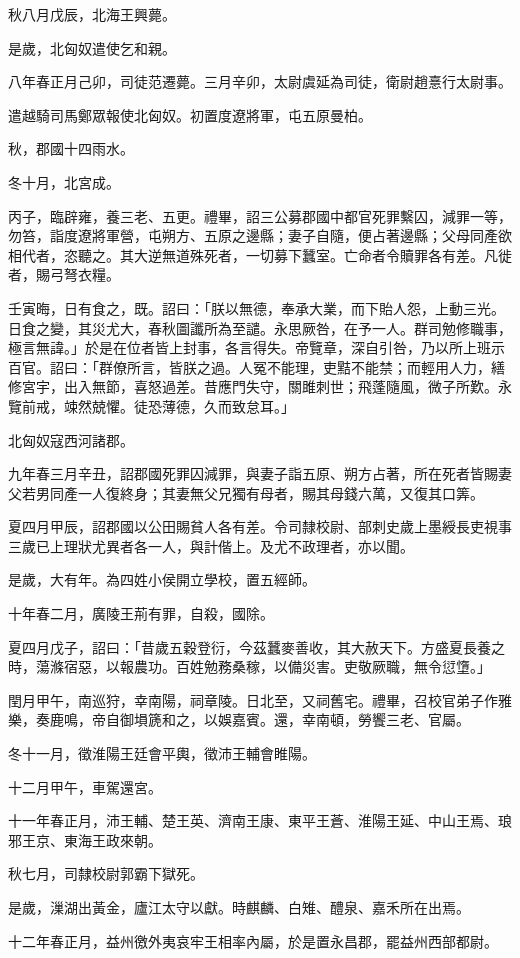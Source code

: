 \begin{pinyinscope}
秋八月戊辰，北海王興薨。

是歲，北匈奴遣使乞和親。

八年春正月己卯，司徒范遷薨。三月辛卯，太尉虞延為司徒，衛尉趙憙行太尉事。

遣越騎司馬鄭眾報使北匈奴。初置度遼將軍，屯五原曼柏。

秋，郡國十四雨水。

冬十月，北宮成。

丙子，臨辟雍，養三老、五更。禮畢，詔三公募郡國中都官死罪繫囚，減罪一等，勿笞，詣度遼將軍營，屯朔方、五原之邊縣；妻子自隨，便占著邊縣；父母同產欲相代者，恣聽之。其大逆無道殊死者，一切募下蠶室。亡命者令贖罪各有差。凡徙者，賜弓弩衣糧。

壬寅晦，日有食之，既。詔曰：「朕以無德，奉承大業，而下貽人怨，上動三光。日食之變，其災尤大，春秋圖讖所為至譴。永思厥咎，在予一人。群司勉修職事，極言無諱。」於是在位者皆上封事，各言得失。帝覽章，深自引咎，乃以所上班示百官。詔曰：「群僚所言，皆朕之過。人冤不能理，吏黠不能禁；而輕用人力，繕修宮宇，出入無節，喜怒過差。昔應門失守，關雎刺世；飛蓬隨風，微子所歎。永覽前戒，竦然兢懼。徒恐薄德，久而致怠耳。」

北匈奴寇西河諸郡。

九年春三月辛丑，詔郡國死罪囚減罪，與妻子詣五原、朔方占著，所在死者皆賜妻父若男同產一人復終身；其妻無父兄獨有母者，賜其母錢六萬，又復其口筭。

夏四月甲辰，詔郡國以公田賜貧人各有差。令司隸校尉、部刺史歲上墨綬長吏視事三歲已上理狀尤異者各一人，與計偕上。及尤不政理者，亦以聞。

是歲，大有年。為四姓小侯開立學校，置五經師。

十年春二月，廣陵王荊有罪，自殺，國除。

夏四月戊子，詔曰：「昔歲五穀登衍，今茲蠶麥善收，其大赦天下。方盛夏長養之時，蕩滌宿惡，以報農功。百姓勉務桑稼，以備災害。吏敬厥職，無令愆墯。」

閏月甲午，南巡狩，幸南陽，祠章陵。日北至，又祠舊宅。禮畢，召校官弟子作雅樂，奏鹿鳴，帝自御塤篪和之，以娛嘉賓。還，幸南頓，勞饗三老、官屬。

冬十一月，徵淮陽王廷會平輿，徵沛王輔會睢陽。

十二月甲午，車駕還宮。

十一年春正月，沛王輔、楚王英、濟南王康、東平王蒼、淮陽王延、中山王焉、琅邪王京、東海王政來朝。

秋七月，司隸校尉郭霸下獄死。

是歲，漅湖出黃金，廬江太守以獻。時麒麟、白雉、醴泉、嘉禾所在出焉。

十二年春正月，益州徼外夷哀牢王相率內屬，於是置永昌郡，罷益州西部都尉。


\end{pinyinscope}
